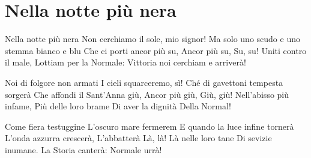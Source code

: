 \section{Nella notte più nera}
\subtitle{Sulla melodia di “Let's Go“ del Coro dell’Armata Rossa}
\begin{canzone}
Nella notte più nera
Non cerchiamo il sole, mio signor!
Ma solo uno scudo e uno stemma bianco e blu
Che ci porti ancor più su, 
Ancor più su,
Su, su!
Uniti contro il male,
Lottiam per la Normale:
Vittoria noi cerchiam e arriverà!

Noi di folgore non armati
I cieli squarceremo, sì!
Ché di gavettoni tempesta sorgerà
Che affondi il Sant’Anna giù, 
Ancor più giù, 
Giù, giù!
Nell’abisso più infame,
Più delle loro brame
Di aver la dignità
Della Normal!

Come fiera testuggine
L’oscuro mare fermerem
E quando la luce infine tornerà
L’onda azzurra crescerà,
L’abbatterà 
Là, là!
Là nelle loro tane
Di sevizie inumane.
La Storia canterà:
Normale urrà!
\end{canzone}
